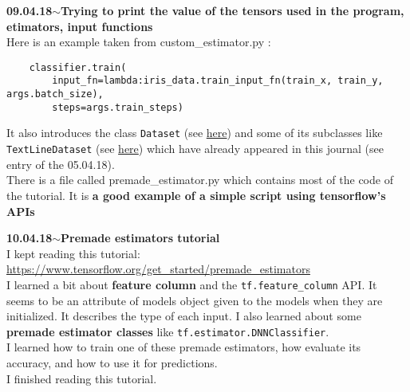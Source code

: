 \documentclass[11pt,a4paper]{article}
\newenvironment{loggentry}[2]%
{\noindent\textbf{#1}\hspace{1cm}$\mathbf{\sim}$\text{ }\textbf{#2}\\}{\vspace{0.5cm}}
\begin{document}
\begin{loggentry}{09.04.18}{Trying to print the value of the tensors used in the program, etimators, input functions}
Here is an example taken from custom\_estimator.py :
\begin{verbatim}
    classifier.train(
        input_fn=lambda:iris_data.train_input_fn(train_x, train_y, args.batch_size),
        steps=args.train_steps)
\end{verbatim}
It also introduces the class \texttt{Dataset} (see \href{https://www.tensorflow.org/api_docs/python/tf/data/Dataset}{here}) and some of its subclasses like \texttt{TextLineDataset} (see \href{https://www.tensorflow.org/api_docs/python/tf/data/TextLineDataset}{here}) which have already appeared in this journal (see entry of the 05.04.18).\\
There is a file called premade\_estimator.py which contains most of the code of the tutorial. It is \textbf{a good example of a simple script using tensorflow's APIs}
\end{loggentry}

\begin{loggentry}{10.04.18}{Premade estimators tutorial}
I kept reading this tutorial:\\
\url{https://www.tensorflow.org/get_started/premade_estimators}\\
I learned a bit about \textbf{feature column} and the \texttt{tf.feature\_column} API. It seems to be an attribute of models object given to the models when they are initialized. It describes the type of each input. I also learned about some \textbf{premade estimator classes} like \texttt{tf.estimator.DNNClassifier}.\\
I learned how to train one of these premade estimators, how evaluate its accuracy, and how to use it for predictions.\\
I finished reading this tutorial.
\end{loggentry}
\end{document}
